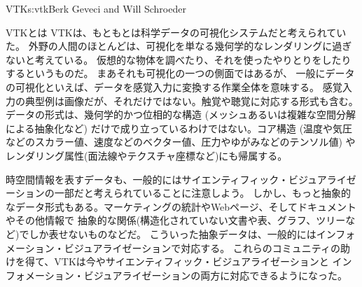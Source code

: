 \begin{aosachapter}{VTK}{s:vtk}{Berk Geveci and Will Schroeder}
\begin{aosasect1}{VTKとは}
VTKは、もともとは科学データの可視化システムだと考えられていた。
外野の人間のほとんどは、可視化を単なる幾何学的なレンダリングに過ぎないと考えている。
仮想的な物体を調べたり、それを使ったやりとりをしたりするというものだ。
まあそれも可視化の一つの側面ではあるが、
一般にデータの可視化といえば、データを感覚入力に変換する作業全体を意味する。
感覚入力の典型例は画像だが、それだけではない。触覚や聴覚に対応する形式も含む。
データの形式は、幾何学的かつ位相的な構造
(メッシュあるいは複雑な空間分解による抽象化など)
だけで成り立っているわけではない。コア構造
(温度や気圧などのスカラー値、速度などのベクター値、圧力やゆがみなどのテンソル値)
やレンダリング属性(面法線やテクスチャ座標など)にも帰属する。

時空間情報を表すデータも、一般的にはサイエンティフィック・ビジュアライゼーションの一部だと考えられていることに注意しよう。
しかし、もっと抽象的なデータ形式もある。マーケティングの統計やWebページ、そしてドキュメントやその他情報で
抽象的な関係(構造化されていない文書や表、グラフ、ツリーなど)でしか表せないものなどだ。
こういった抽象データは、一般的にはインフォメーション・ビジュアライゼーションで対応する。
これらのコミュニティの助けを得て、VTKは今やサイエンティフィック・ビジュアライゼーションと
インフォメーション・ビジュアライゼーションの両方に対応できるようになった。


\end{aosasect1}
\end{aosachapter}
